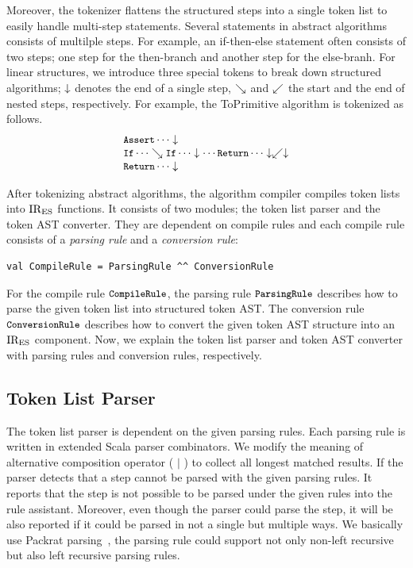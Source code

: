 Moreover, the tokenizer flattens the structured steps into
a single token list to easily handle multi-step statements.
Several statements in abstract algorithms consists of multilple steps.
For example, an if-then-else statement often consists of two steps;
one step for the then-branch and another step for the else-branh.
For linear structures, we introduce three special tokens to break down structured
algorithms; \( \downarrow \) denotes the end of a single step,
\( \searrow \) and \( \swarrow \) the start and the end of nested steps, respectively.
For example, the ToPrimitive algorithm is tokenized as follows.
\[
  \begin{array}{l}
    \texttt{\small Assert} \cdots \downarrow\\
    \texttt{\small If} \cdots \searrow \texttt{\small If} \cdots \downarrow
    \cdots \texttt{\small Return} \cdots \downarrow \swarrow \downarrow\\
    \texttt{\small Return} \cdots \downarrow\\
  \end{array}
\]

After tokenizing abstract algorithms, the algorithm compiler compiles token lists
into \( \text{IR}_\text{ES} \) functions. It consists of two modules; the token list parser and
the token AST converter. They are dependent on compile rules and each compile rule
consists of a \textit{parsing rule} and a \textit{conversion rule}:
\begin{lstlisting}[style=myScalastyle]
val CompileRule = ParsingRule ^^ ConversionRule
\end{lstlisting}
For the compile rule \( \texttt{\small CompileRule} \), the parsing rule
\( \texttt{\small ParsingRule} \) describes how to parse the given token list into structured
token AST. The conversion rule \( \texttt{\small ConversionRule} \) describes how to
convert the given token AST structure into an \( \text{IR}_\text{ES} \) component.
Now, we explain the token list parser and token AST converter with
parsing rules and conversion rules, respectively.

\subsection{Token List Parser}

The token list parser is dependent on the given parsing rules.
Each parsing rule is written in extended Scala parser combinators.
We modify the meaning of alternative composition operator ( \( | \) ) to collect
all longest matched results. If the parser detects that a step cannot be
parsed with the given parsing rules. It reports that the step is not possible
to be parsed under the given rules into the rule assistant.
Moreover, even though the parser could parse the step, it will be also reported
if it could be parsed in not a single but multiple ways.
We basically use Packrat parsing~\cite{packrat}, the parsing rule could support
not only non-left recursive but also left recursive parsing rules.

